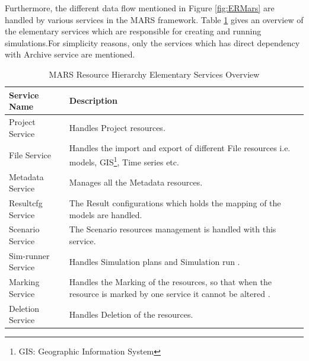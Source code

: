         \newpage
        Furthermore, the different data flow mentioned in Figure \ref{fig:ERMars} are handled by various services in the MARS framework. 
        Table \ref{table:MARS Resource Hierarchy Service Overview} gives an overview of the elementary services which are responsible for 
        creating and running simulations.For simplicity reasons, only the services
        which has direct dependency with Archive service are mentioned.
        \begin{table}[h!]
            \centering
            \begin{tabular}{|p{4cm}|p{11cm}|}
                \hline
                    \textbf{Service Name}  & \textbf{Description}\\
                \hline
                    Project Service & 
                    Handles Project resources. \\
                \hline
                    File Service
                    & Handles the import and export of different File resources i.e. models, GIS\footnote{\label{footnote:GIS}GIS: Geographic Information System}, 
                    Time series etc.\\
                \hline
                    Metadata Service  & Manages all the Metadata resources.\\
                \hline
                    Resultcfg Service  & The Result configurations which holds the mapping of the models are handled.\\
                \hline
                    Scenario Service  & The Scenario resources management is handled with this service.\\
                \hline
                    Sim-runner Service  & Handles Simulation plans and Simulation run .\\
                \hline
                    Marking Service  & Handles the Marking of the resources, so that when the resource is marked by one service it cannot be altered .\\
                \hline
                    Deletion Service  & Handles Deletion of the resources.\\
                \hline
            \end{tabular}
            \caption{MARS Resource Hierarchy Elementary Services Overview}
            \label{table:MARS Resource Hierarchy Service Overview}     
        \end{table}    